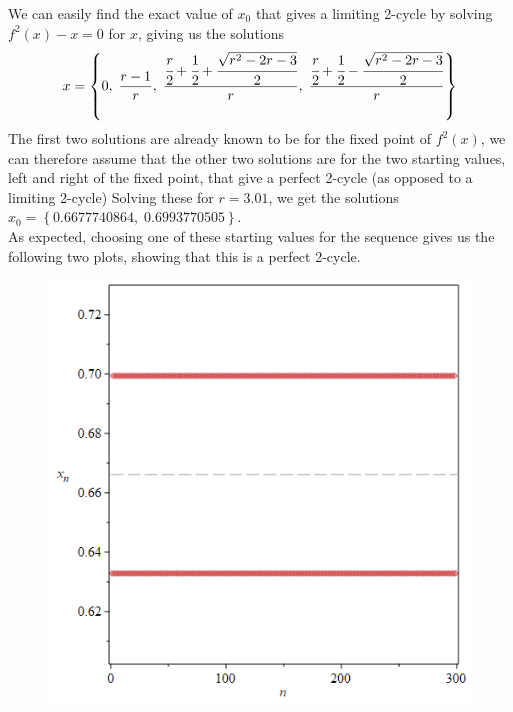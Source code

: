 \documentclass[12pt]{article}
\begin{document}
\newpage
We can easily find the exact value of $x_0$ that gives a limiting 2-cycle by solving $f^2(x)-x=0$ for $x$, giving us the solutions
\[x=\left\{0,\;\frac{r-1}{r},\;\frac{\cfrac{r}{2}+\cfrac{1}{2}+\cfrac{\sqrt{r^2-2r-3}}{2}}{r},\;\frac{\cfrac{r}{2}+\cfrac{1}{2}-\cfrac{\sqrt{r^2-2r-3}}{2}}{r}\right\}\]
The first two solutions are already known to be for the fixed point of $f^2(x)$, we can therefore assume that the other two solutions are for the two starting values, left and right of the fixed point, that give a perfect 2-cycle (as opposed to a limiting 2-cycle)
Solving these for $r=3.01$, we get the solutions $x_0=\left\{0.6677740864,\;0.6993770505\right\}$.\\ 
As expected, choosing one of these starting values for the sequence gives us the following two plots, showing that this is a perfect 2-cycle.
\begin{figure}[H]
	\centering
	\hfill
	\begin{minipage}{.45\textwidth}
		\centering
		\includegraphics[scale=0.4]{per3p05Per.png}
		\label{fig:test1}
	\end{minipage}%
	\hfill
	\begin{minipage}{.45\textwidth}
		\centering

\end{minipage}
\end{figure}
\end{document}
